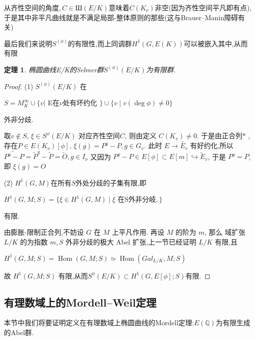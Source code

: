 \documentclass[11pt]{ctexart}
\DeclareMathOperator{\Hom}{Hom}
\DeclareMathOperator{\Deg}{deg}
\newtheorem{thm}{定理}[section]
\begin{document}
从齐性空间的角度$,C\in$Ш$(E/K)$意味着$C(K_{\nu})$非空(因为齐性空间平凡即有点), 于是其中非平凡曲线就是不满足局部-整体原则的那些(这与Brauer--Manin障碍有关\cite{CTM 144})

最后我们来说明$S^{(\phi)}$的有限性,而上同调群$H^1(G,E(K))$可以被嵌入其中,从而有限
\begin{thm}椭圆曲线E/K的Selmer群$S^{(\phi)}(E/K)$为有限群.
\end{thm}


\begin{proof}
(1) $S^({\phi})(E/K)$ 在 
\begin{center}
    
    $S =M_K^{\infty}\cup  \{v|$ E在$\nu$处有坏约化 $\} \cup\{ v\mid v(\Deg\phi) \ne 0\} $ 
    
\end{center}外非分歧.

取$v\notin S$, $\xi\in S^{\phi}(E/K)$ 对应齐性空间$C$, 则由定义 $C(K_v)\neq 0$. 于是由正合列$\ast$ ,
存在$ P\in E(K_{\nu})[\phi]$, $\xi(g) = P^g - P, g\in G_v$. 
此时 $E\rightarrow \widetilde{E_v}$ 有好约化,所以 
$ \widetilde{P^g- P} = \widetilde{P}^g - \widetilde{P} = \widetilde{O} $$,g\in I_{\nu}$
又因为 $P^g-P\in E[\phi]\subset E[m] \hookrightarrow \widetilde{E}_v $, 于是 $P^g = P$, 即 $\xi(g) = O$  

\noindent (2) $H^1(G,M)$在所有$S$外处分歧的子集有限,即
\begin{center}
    $H^1(G,M;S) = \{\xi\in H^1(G,M)\mid \xi$ 在S外非分岐$, \} $
\end{center}
有限.

由膨胀-限制正合列,不妨设 $G$ 在 $M$ 上平凡作用.
再设 $M$ 的阶为 $m$, 那么 域扩张$L/K$ 的为指数 $m,S$ 外非分歧的极大 Abel 扩张,上一节已经证明 $L/K$ 有限,且
\begin{center}
   $ H^1(G,M;S) = \Hom(G,M;S) \simeq \Hom(Gal_{L/K},M;S)$
\end{center}
故 $ H^1(G,M;S)$ 有限,从而$S^{\phi}(E/K) \subset H^1(G,E[\phi];S)$有限.
\end{proof}


\subsection{有理数域上的Mordell--Weil定理}


本节中我们将要证明定义在有理数域上椭圆曲线的Mordell定理:$E(\mathbb{Q})$为有限生成的Abel群.
\end{document}
